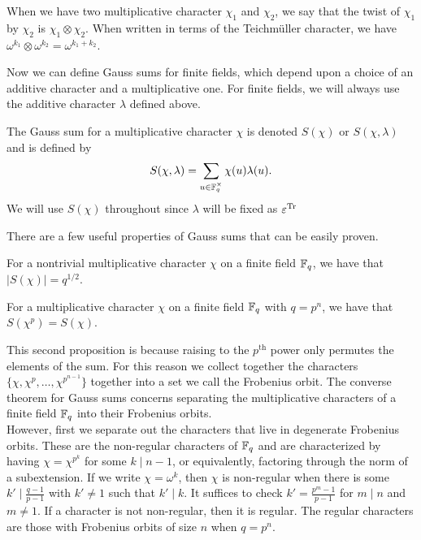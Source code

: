When we have two multiplicative character $\chi_1$ and $\chi_2$, we say that the twist of $\chi_1$ by $\chi_2$ is $\chi_1 \otimes \chi_2$.
When written in terms of the Teichm\"uller character, we have $\omega^{k_1} \otimes \omega^{k_2} = \omega^{k_1+k_2}$.

Now we can define Gauss sums for finite fields, which depend upon a choice of an additive character and a multiplicative one. 
For finite fields, we will always use the additive character $\lambda$ defined above.
\begin{defn}\label{def:Gsum-FF}
  The Gauss sum for a multiplicative character $\chi$ is denoted $S(\chi)$ or $S(\chi, \lambda)$ and is defined by \[S(\chi, \lambda) = \sum_{u \in \mathbb{F}_q^\times} \chi(u) \lambda(u).\]
  We will use $S(\chi)$ throughout since $\lambda$ will be fixed as $\varepsilon^{\textrm{Tr}}$
\end{defn}
\noindent There are a few useful properties of Gauss sums that can be easily proven.
\begin{prop}
For a nontrivial multiplicative character $\chi$ on a finite field $\mathbb{F}_q$, we have that $|S(\chi)| = q^{1/2}$.
\end{prop}
\begin{prop}
For a multiplicative character $\chi$ on a finite field $\mathbb{F}_q$ with $q = p^n$, we have that $S(\chi^p) = S(\chi)$.
\end{prop}
This second proposition is because raising to the $p^\text{th}$ power only permutes the elements of the sum. 
For this reason we collect together the characters $\{\chi, \chi^{p}, \ldots, \chi^{p^{n-1}}\}$ together into a set we call the Frobenius orbit.
The converse theorem for Gauss sums concerns separating the multiplicative characters of a finite field $\mathbb{F}_q$ into their Frobenius orbits.\\

However, first we separate out the characters that live in degenerate Frobenius orbits. 
These are the non-regular characters of $\mathbb{F}_q$ and are characterized by having $\chi = \chi^{p^k}$ for some $k \mid n-1$, or equivalently, factoring through the norm of a subextension. 
If we write $\chi = \omega^k$, then $\chi$ is non-regular when there is some $k' \mid \frac{q-1}{p-1}$ with $k' \neq 1$ such that $k' \mid k$.
It suffices to check $k' = \frac{p^m - 1}{p-1}$ for $m \mid n$ and $m \neq 1$.
If a character is not non-regular, then it is regular. 
The regular characters are those with Frobenius orbits of size $n$ when $q = p^n$.\\

